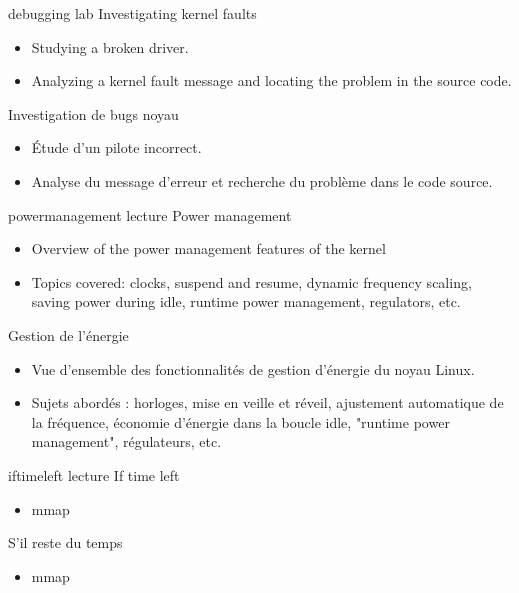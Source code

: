 {debugging}
{lab}
{Investigating kernel faults}
{
  \begin{itemize}
  \item Studying a broken driver.
  \item Analyzing a kernel fault message and locating the problem in the
    source code.
  \end{itemize}
}
{Investigation de bugs noyau}
{
  \begin{itemize}
  \item Étude d'un pilote incorrect.
  \item Analyse du message d'erreur et recherche du problème dans le code
    source.
  \end{itemize}
}
{powermanagement}
{lecture}
{Power management}
{
  \begin{itemize}
  \item Overview of the power management features of the kernel
  \item Topics covered: clocks, suspend and resume, dynamic frequency
    scaling, saving power during idle, runtime power management,
    regulators, etc.
  \end{itemize}
}
{Gestion de l'énergie}
{
  \begin{itemize}
  \item Vue d'ensemble des fonctionnalités de gestion d'énergie du noyau
    Linux.
  \item Sujets abordés : horloges, mise en veille et réveil, ajustement
    automatique de la fréquence, économie d'énergie dans la boucle idle,
    "runtime power management", régulateurs, etc.
  \end{itemize}
}
{iftimeleft}
{lecture}
{If time left}
{
  \begin{itemize}
  \item mmap
  \end{itemize}
}
{S'il reste du temps}
{
  \begin{itemize}
  \item mmap
  \end{itemize}
}

